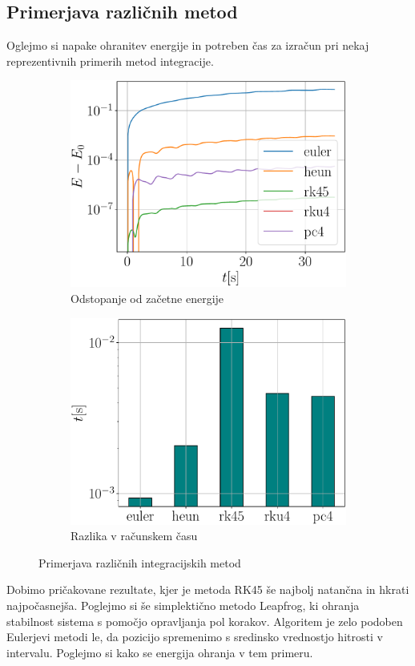 \documentclass{article}
\begin{document}
\subsection{Primerjava različnih metod}
Oglejmo si napake ohranitev energije in potreben čas za izračun pri nekaj reprezentivnih primerih metod integracije.
\begin{figure}[H]
    \centering
    \begin{subfigure}[b]{0.49\textwidth}
		\centering
		\includegraphics[width=\linewidth]{diffenergy.pdf}
		\caption{Odstopanje od začetne energije}
    \end{subfigure}
    \hfill
    \begin{subfigure}[b]{0.49\textwidth}
        \centering
        \includegraphics[width=\linewidth]{difftime.pdf}
        \caption{Razlika v računskem času}
    \end{subfigure}
	\caption{Primerjava različnih integracijskih metod}
\end{figure}
Dobimo pričakovane rezultate, kjer je metoda RK45 še najbolj natančna in hkrati najpočasnejša. Poglejmo si še simplektično metodo Leapfrog, ki ohranja stabilnost sistema s pomočjo opravljanja pol korakov. Algoritem je zelo podoben Eulerjevi metodi le, da pozicijo spremenimo s sredinsko vrednostjo hitrosti v intervalu. Poglejmo si kako se energija ohranja v tem primeru.
\end{document}
